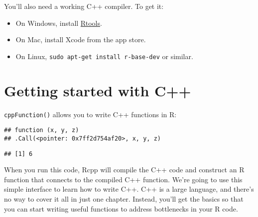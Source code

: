 You'll also need a working C++ compiler. To get it:

\begin{itemize}
\tightlist
\item
  On Windows, install
  \href{http://cran.r-project.org/bin/windows/Rtools/}{Rtools}.
\item
  On Mac, install Xcode from the app store.
\item
  On Linux, \texttt{sudo\ apt-get\ install\ r-base-dev} or similar.
\end{itemize}

\hypertarget{rcpp-intro}{%
\section{Getting started with C++}\label{rcpp-intro}}

\texttt{cppFunction()} allows you to write C++ functions in R:

\begin{Shaded}
\begin{Highlighting}[]
\NormalTok{(}
\NormalTok{)}
\end{Highlighting}
\end{Shaded}

\begin{verbatim}
## function (x, y, z) 
## .Call(<pointer: 0x7ff2d754af20>, x, y, z)
\end{verbatim}

\begin{Shaded}
\begin{Highlighting}[]
\NormalTok{(}\NormalTok{, }\NormalTok{, }\NormalTok{)}
\end{Highlighting}
\end{Shaded}

\begin{verbatim}
## [1] 6
\end{verbatim}

When you run this code, Rcpp will compile the C++ code and construct an
R function that connects to the compiled C++ function. We're going to
use this simple interface to learn how to write C++. C++ is a large
language, and there's no way to cover it all in just one chapter.
Instead, you'll get the basics so that you can start writing useful
functions to address bottlenecks in your R code.

